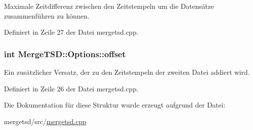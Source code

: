 Maximale Zeitdifferenz zwischen den Zeitstempeln um die Datensätze zusammenführen zu können. 



Definiert in Zeile 27 der Datei mergetsd.\-cpp.

\hypertarget{structMergeTSD_1_1Options_ac83ae2ea134ea0377d85739d2436ccff}{
\subsubsection[{offset}]{\setlength{\rightskip}{0pt plus 5cm}int Merge\-T\-S\-D\-::\-Options\-::offset}}\label{structMergeTSD_1_1Options_ac83ae2ea134ea0377d85739d2436ccff}


Ein zusätzlicher Versatz, der zu den Zeitstempeln der zweiten Datei addiert wird. 



Definiert in Zeile 26 der Datei mergetsd.\-cpp.



Die Dokumentation für diese Struktur wurde erzeugt aufgrund der Datei\-:\begin{DoxyCompactItemize}
\item 
mergetsd/src/\hyperlink{mergetsd_8cpp}{mergetsd.\-cpp}\end{DoxyCompactItemize}

